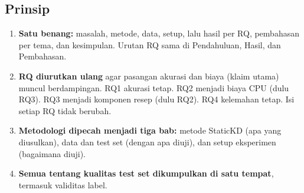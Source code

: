 \documentclass[10pt,a4paper]{article}
\begin{document}
\subsection{Prinsip}
\begin{enumerate}
  \item \textbf{Satu benang:} masalah, metode, data, setup, lalu hasil per RQ, pembahasan per tema, dan kesimpulan. Urutan RQ sama di Pendahuluan, Hasil, dan Pembahasan.
  \item \textbf{RQ diurutkan ulang} agar pasangan akurasi dan biaya (klaim utama) muncul berdampingan. RQ1 akurasi tetap. RQ2 menjadi biaya CPU (dulu RQ3). RQ3 menjadi komponen resep (dulu RQ2). RQ4 kelemahan tetap. Isi setiap RQ tidak berubah.
  \item \textbf{Metodologi dipecah menjadi tiga bab:} metode StaticKD (apa yang diusulkan), data dan test set (dengan apa diuji), dan setup eksperimen (bagaimana diuji).
  \item \textbf{Semua tentang kualitas test set dikumpulkan di satu tempat}, termasuk validitas label.
\end{enumerate}
\end{document}
